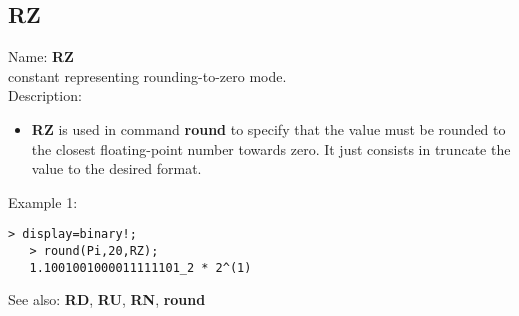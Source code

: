\subsection{ RZ }
\noindent Name: \textbf{RZ}\\
constant representing rounding-to-zero mode.\\

\noindent Description: \begin{itemize}

\item \textbf{RZ} is used in command \textbf{round} to specify that the value must be rounded
   to the closest floating-point number towards zero. It just consists in 
   truncate the value to the desired format.
\end{itemize}
\noindent Example 1: 
\begin{center}\begin{minipage}{14.8cm}\begin{Verbatim}[frame=single]
   > display=binary!;
   > round(Pi,20,RZ);
   1.1001001000011111101_2 * 2^(1)
\end{Verbatim}
\end{minipage}\end{center}
See also: \textbf{RD}, \textbf{RU}, \textbf{RN}, \textbf{round}
